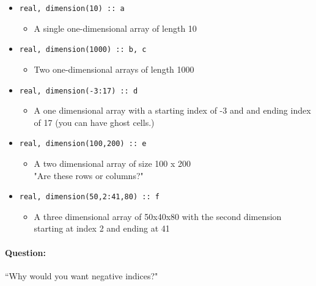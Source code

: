 \documentclass[11pt]{article}
\begin{document}
  \begin{itemize}
  \item
\begin{verbatim}
real, dimension(10) :: a
\end{verbatim}
    \begin{itemize}
    \item A  single one-dimensional array of length 10
    \end{itemize}

  \item
\begin{verbatim}
real, dimension(1000) :: b, c
\end{verbatim}
    \begin{itemize}
    \item Two one-dimensional arrays of length 1000
    \end{itemize}

  \item
\begin{verbatim}
real, dimension(-3:17) :: d
\end{verbatim}
    \begin{itemize}
    \item A one dimensional array with a starting index of -3 and and ending index of 17 (you can have ghost cells.)
    \end{itemize}

  \item
\begin{verbatim}
real, dimension(100,200) :: e
\end{verbatim}
    \begin{itemize}
    \item A two dimensional array of size 100 x 200\\
    "Are these rows or columns?"
    \end{itemize}

  \item
\begin{verbatim}
real, dimension(50,2:41,80) :: f
\end{verbatim}
    \begin{itemize}
    \item A three dimensional array of 50x40x80 with the second dimension starting at index 2 and ending at 41
    \end{itemize}
  \end{itemize}
\paragraph{Question:}``Why would you want negative indices?"
\end{document}
